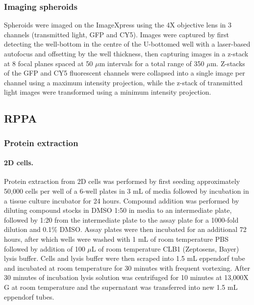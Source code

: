 \documentclass[a4paper,11pt,twoside,openright]{scrbook}
\begin{document}
\subsubsection{Imaging spheroids}

Spheroids were imaged on the ImageXpress using the 4X objective lens in 3 channels (transmitted light, GFP and CY5).
Images were captured by first detecting the well-bottom in the centre of the U-bottomed well with a laser-based 
autofocus and offsetting by the well thickness, then capturing images in a z-stack at 8 focal planes spaced at 50 
$\mu$m intervals for a total range of 350 $\mu$m.
Z-stacks of the GFP and CY5 fluorescent channels were collapsed into a single image per channel using a maximum 
intensity projection, while the z-stack of transmitted light images were transformed using a minimum intensity 
projection.


\subsection{RPPA}

\subsubsection{Protein extraction}

\paragraph{2D cells.}
Protein extraction from 2D cells was performed by first seeding approximately 50,000 cells per well of a 6-well plates 
in 3 mL of media followed by incubation in a tissue culture incubator for 24 hours.
Compound addition was performed by diluting compound stocks in DMSO 1:50 in media to an intermediate plate, followed by 
1:20 from the intermediate plate to the assay plate for a 1000-fold dilution and 0.1\% DMSO.
Assay plates were then incubated for an additional 72 hours, after which wells were washed with 1 mL of room 
temperature PBS followed by addition of 100 $\mu$L of room temperature CLB1 (Zeptosens, Bayer) lysis buffer.
Cells and lysis buffer were then scraped into 1.5 mL eppendorf tube and incubated at room temperature for 30 minutes 
with frequent vortexing.
After 30 minutes of incubation lysis solution was centrifuged for 10 minutes at 13,000X G at room temperature and the 
supernatant was transferred into new 1.5 mL eppendorf tubes.
\end{document}
